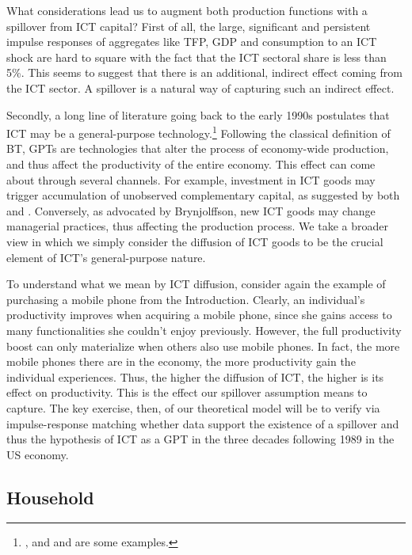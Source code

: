 \documentclass[12pt]{article}
\begin{document}
What considerations lead us to augment both production functions with a spillover from ICT capital? First of all, the large, significant and persistent impulse responses of aggregates like TFP, GDP and consumption to an ICT shock are hard to square with the fact that the ICT sectoral share is less than 5\%. This seems to suggest that there is an additional, indirect effect coming from the ICT sector. A spillover is a natural way of capturing such an indirect effect.

Secondly, a long line of literature going back to the early 1990s postulates that ICT may be a general-purpose technology.\footnote{\cite{basu2003case}, \cite{basu2007information} and \cite{oliner2000resurgence} and are some examples.} %
Following the classical definition of BT,
 GPTs are technologies that alter the process of economy-wide production, and thus affect the productivity of the entire economy. This effect can come about  through several channels. For example, investment in ICT goods may trigger accumulation of unobserved complementary capital, as suggested by both \cite{basu2003case} and \cite{basu2007information}. Conversely, as advocated by Brynjolffson, new ICT goods may change managerial practices, thus affecting the production process. We take a broader view in which we simply consider the diffusion of ICT goods to be the crucial element of ICT's general-purpose nature. 
 
To understand what we mean by ICT diffusion, consider again the example of purchasing a mobile phone from the Introduction. Clearly, an individual's productivity improves when acquiring a mobile phone, since she gains access to many functionalities she couldn't enjoy previously. However, the full productivity boost can only materialize when others also use mobile phones. In fact, the more mobile phones there are in the economy, the more productivity gain the individual experiences. Thus, the higher the diffusion of ICT, the higher is its effect on productivity. This is the effect our spillover assumption means to capture. The key exercise, then, of our theoretical model will be to verify via impulse-response matching whether data support the existence of a spillover and thus the hypothesis of ICT as a GPT in the three decades following 1989 in the US economy.

\subsection{Household}
\end{document}
